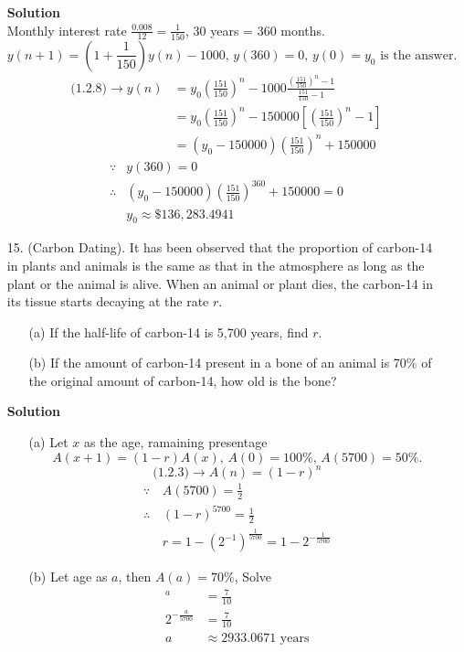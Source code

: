 \begin{enumerate}
        \textbf{Solution} \\
        Monthly interest rate $\frac{0.008}{12}=\frac{1}{150}$, 30 years = 360 months. \\
        $$y(n+1)=(1+\frac{1}{150})y(n)-1000,\,y(360)=0,\,y(0)=y_0\text{ is the answer.}$$
        \begin{align*}
            \text{(1.2.8)}\to y(n) & =y_0\left(\frac{151}{150}\right)^n -1000\frac{(\frac{151}{150})^n-1}{\frac{151}{150}-1} \\
                                   & =y_0\left(\frac{151}{150}\right)^n -150000\left[\left(\frac{151}{150}\right)^n-1\right] \\
                                   & =(y_0-150000)\left(\frac{151}{150}\right)^n +150000
        \end{align*}
        \begin{align*}
            \because & y(360)=0 \\
            \therefore & (y_0-150000)\left(\frac{151}{150}\right)^{360}+150000=0 \\
            & y_0\approx \$136,283.4941
        \end{align*}
    \item[15.] (Carbon Dating). It has been observed that the proportion of carbon-14 in plants and animals is the same as that in the atmosphere as long as the plant or the animal is alive. When an animal or plant dies, the carbon-14 in its tissue starts decaying at the rate $r$.
        \begin{itemize}
            \item[(a)] If the half-life of carbon-14 is 5,700 years, find $r$.
            \item[(b)] If the amount of carbon-14 present in a bone of an animal is 70\% of the original amount of carbon-14, how old is the bone?
        \end{itemize}
        \textbf{Solution}
        \begin{itemize}
            \item[(a)] Let $x$ as the age, ramaining presentage
                $$A(x+1)=(1-r)A(x),\,A(0)=100\%,\,A(5700)=50\%.$$
                 $$\text{(1.2.3)}\to A(n)=(1-r)^n$$
                 \begin{align*}
                    \because\, & A(5700)=\frac{1}{2} \\
                    \therefore\, & (1-r)^{5700}=\frac{1}{2} \\
                               & r=1-(2^{-1})^\frac{1}{5700}=1-2^{-\frac{1}{5700}}
                 \end{align*}
             \item[(b)] Let age as $a$, then $A(a)=70\%$, Solve
                 \begin{align*}
                     [1-(1-2^{-\frac{1}{5700}})]^{a} & =\frac{7}{10} \\
                                 2^{-\frac{a}{5700}} & =\frac{7}{10} \\
                                 a & \approx 2933.0671\text{ years}
                \end{align*}
        \end{itemize}
\end{enumerate}
